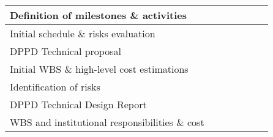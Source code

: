 \begin{table}[htpb]
\begin{center}
\begin{tabular}{|l|c|c|c|c|c|c|}
Definition of milestones \& activities &  \cellcolor{gray} & & & & & \\ \hline
Initial schedule \& risks evaluation & &  \cellcolor{gray} & & & & \\ \hline
DPPD Technical proposal & &  \cellcolor{gray} & & & & \\ \hline
Initial WBS \& high-level cost estimations & &  \cellcolor{gray} & & & & \\ \hline
Identification of risks & & & & &  \cellcolor{gray} & \\ \hline
DPPD Technical Design Report & & & & & &  \cellcolor{gray} \\ \hline
WBS and institutional responsibilities \& cost & & & & & &  \cellcolor{gray} \\ \hline
\end{tabular}
\label{tab:schedule}
\end{center}
\end{table}

